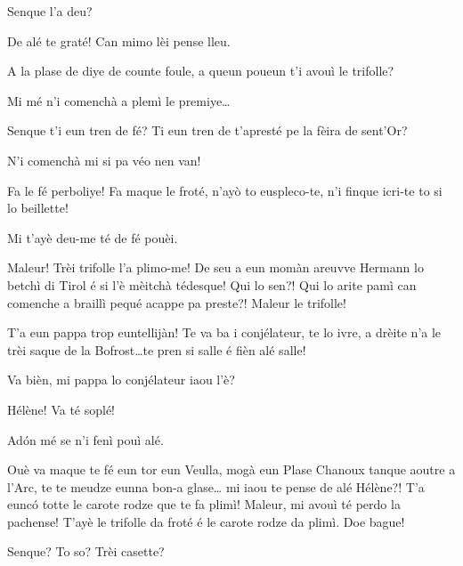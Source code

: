 \begin{drama}
\Cesarspeaks Senque l'a deu?

\Helenespeaks{} De alé te graté! Can mimo lèi pense lleu.

\Cesarspeaks A la plase de diye de counte foule, a queun poueun t'i avouì le trifolle?

\Helenespeaks  Mi mé n'i comenchà a plemì le premiye\ldots 

\Cesarspeaks Senque t'i eun tren de fé? Ti eun tren de t'apresté pe la fèira de sent'Or?

\Helenespeaks N'i comenchà mi si pa véo nen van!

\Cesarspeaks{} Fa le fé perboliye! Fa maque le froté, n'ayò to euspleco-te, n'i finque icri-te to si lo beillette! 

\Helenespeaks Mi t'ayè deu-me té de fé pouèi.

\Cesarspeaks{} Maleur! Trèi trifolle l'a plimo-me! De seu a eun momàn areuvve Hermann lo betchì di Tirol é si l'è mèitchà tédesque! Qui lo sen?! Qui lo arite pamì can comenche a braillì pequé acappe pa preste?! Maleur le trifolle!


\Cesarspeaks{} T'a eun pappa trop euntellijàn! Te va ba i conjélateur, te lo ivre, a drèite n'a le trèi saque de la Bofrost\ldots te pren si salle é fièn alé salle!

\Helenespeaks Va bièn, mi pappa lo conjélateur iaou l'è?

\Cesarspeaks{} Hélène! Va té soplé!

 
\Helenespeaks  Ad\'on mé se n'i fenì pouì alé.

\Cesarspeaks{} Ouè va maque te fé eun tor eun Veulla, mogà eun Plase Chanoux tanque aoutre a l'Arc, te te meudze eunna bon-a glase\ldots {} mi iaou te pense de alé Hélène?! T'a eunc\'o totte le carote rodze que te fa plimì! Maleur, mi avouì té perdo la pachense! T'ayè le trifolle da froté é le carote rodze da plimì. Doe bague!


\Helenespeaks Senque? To so? Trèi casette?


\end{drama}
